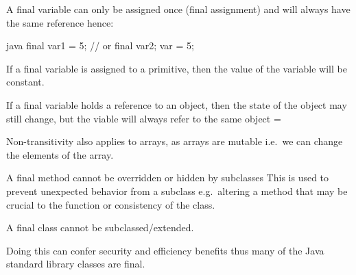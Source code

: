 \begin{defnbox}\nospacing
  \begin{defn}\label{defn:finalVar}
    A final variable can only be assigned once (final assignment) and will
    always have the same reference hence:
    \begin{mintlinebox}{java}
      final var1 = 5; // or
      final var2;
      var = 5;
    \end{mintlinebox}
    \begin{itemizenosep}
        \item If a final variable is assigned to a primitive, then the value of
        the variable will be constant.
        \item If a final variable holds a reference to an object, then the state
        of the object may still change, but the viable will always refer to the
        same object = 
    \end{itemizenosep}
  \end{defn}
\end{defnbox}
\begin{notebox}[Note]\nospacing
  Non-transitivity also applies to arrays, as arrays are mutable i.e.\ we can change
  the elements of the array.
\end{notebox}
\begin{defnbox}\nospacing
  \begin{defn}\label{defn:finalMethods}
    A final method cannot be overridden or hidden by subclasses
    This is used to prevent unexpected behavior from a subclass e.g.\
    altering a method that may be crucial to the function or consistency of the class.
  \end{defn}
\end{defnbox}
\begin{defnbox}\nospacing
  \begin{defn}\label{defn:finalClasses}
  A final class cannot be subclassed/extended.
  \end{defn}
\end{defnbox}
\begin{notebox}[Note]\nospacing
  Doing this can confer security and efficiency benefits thus
  many of the Java standard library classes are final.
\end{notebox}
